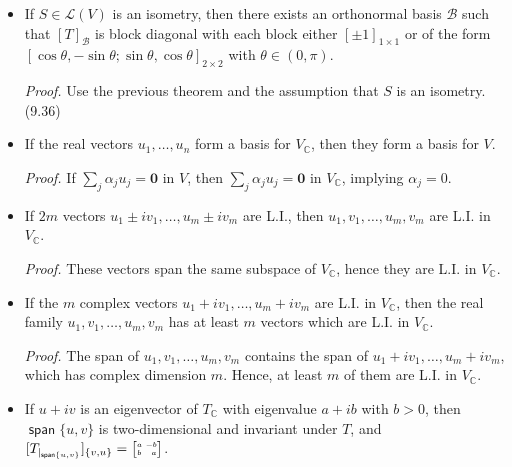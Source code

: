 \documentclass[11pt]{article}
\newcommand{\1}{\mathbf{1}}
\newcommand{\0}{\mathbf{0}}
\newcommand{\C}{\mathbb{C}}
\newcommand{\cL}{\mathcal{L}}
\DeclareMathOperator{\myspan}{\mathsf{span}}
\newcommand{\abba}{{\tiny \begin{bmatrix} a \ {-\!\!\;b} \\ b \ \ \ a \end{bmatrix}}}
\begin{document}
{\begin{itemize}
\item

If $S \in \cL(V)$ is an isometry, then  there exists an orthonormal basis $\mathcal{B}$ such that $[T]_{\mathcal{B}}$ is block diagonal with
each block either $[ \pm 1]_{1 \times 1}$ or of the form
\( [ \cos \theta  , -\sin \theta  ; \sin \theta , \cos \theta ]_{2 \times 2} \)
with $\theta \in (0,\pi)$.

\emph{Proof.} Use the previous theorem and the assumption that $S$ is an isometry.
\hfill
(9.36)

\item

If the real vectors $ u_1,\dots,u_n $ form a basis for $ V_\C $, then they form a basis for $ V. $

\emph{Proof.}
If $ \sum_j \alpha_j u_j = \0 $ in $ V $, then $ \sum_j \alpha_j u_j = \0 $ in $ V_\C $, implying $ \alpha_j=0. $


\item

If $ 2m $ vectors $ u_1 \pm i v_1,\dots,u_m \pm i v_m $ are L.I., then  
$ u_1,v_1,\dots,u_m,v_m $ are L.I. in $ V_\C. $

\emph{Proof.}
These vectors span the same subspace of $ V_\C $, hence they are L.I. in $ V_\C $.


\item

If the $ m $ complex vectors $ u_1+iv_1,\dots,u_m+iv_m $ are L.I. in $ V_\C $, then the real family $ u_1,v_1,\dots,u_m,v_m $ has at least $ m $ vectors which are L.I. in $ V_\C $.

\emph{Proof.}
The span of $ u_1,v_1,\dots,u_m,v_m $ contains the span of $ u_1+iv_1,\dots,u_m+iv_m $, which has complex dimension $ m $. Hence, at least $ m $ of them are L.I. in $ V_\C $.


\item

If $ u+iv $ is an eigenvector of $ T_\C $ with eigenvalue $ a+ib $ with $ b>0 $, then $ \myspan\{u,v\} $ is two-dimensional and invariant under $ T $, and
$ [T_{|_{\myspan\{u,v\}}}]_{\{v,u\}} = \abba $.


\end{itemize}}
\end{document}
